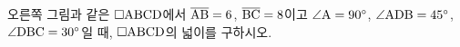 \noindent\begin{minipage}[t]{0.58\linewidth}\vspace{0pt}\raggedright 오른쪽 그림과 같은 $\square\mathrm{ABCD}$에서 $\overline{\mathrm{AB}}=6$, $\overline{\mathrm{BC}}=8$이고 $\angle\mathrm{A}=90^\circ$, $\angle\mathrm{ADB}=45^\circ$, $\angle\mathrm{DBC}=30^\circ$일 때, $\square\mathrm{ABCD}$의 넓이를 구하시오.\end{minipage}\hfill\begin{minipage}[t]{0.4\linewidth}\vspace{0pt}\centering \resizebox{\ifdim\width>\linewidth\linewidth\else\width\fi}{!}{}\end{minipage}\par
